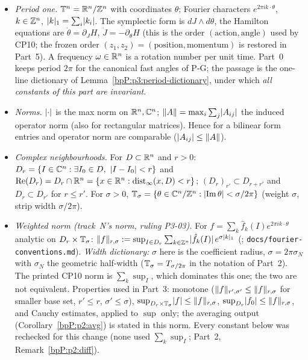 \begin{itemize}
\item \emph{Period one.} $\mathbb{T}^n=\mathbb{R}^n/\mathbb{Z}^n$ with coordinates $\theta$; Fourier characters $e^{2\pi ik\cdot\theta}$, $k\in\mathbb{Z}^n$,
  $\lvert k\rvert_1=\sum_i\lvert k_i\rvert$. The symplectic form is $dJ\wedge d\theta$, the Hamilton equations are $\dot\theta=\partial_JH$,
  $\dot J=-\partial_\theta H$ (this is the order $(\text{action},\text{angle})$ used by CP10; the frozen order
  $(z_1,z_2)=(\text{position},\text{momentum})$ is restored in Part~5). A frequency $\omega\in\mathbb{R}^n$ is a rotation number per unit time.
  Part~0 keeps period $2\pi$ for the canonical fast angles of P-G; the passage is the one-line dictionary of
  Lemma~\ref{bpP:p3:period-dictionary}, under which \emph{all constants of this part are invariant}.
\item \emph{Norms.} $\lvert \cdot\rvert$ is the max norm on $\mathbb{R}^n,\mathbb{C}^n$; $\lVert A\rVert=\max_i\sum_j\lvert A_{ij}\rvert$ the induced operator norm
  (also for rectangular matrices). Hence for a bilinear form entries and operator norm are comparable
  ($\lvert A_{ij}\rvert\le\lVert A\rVert$).
\item \emph{Complex neighbourhoods.} For $D\subset\mathbb{R}^n$ and $r>0$: $D_r=\{I\in\C^n:\exists I_0\in D,\ \abs{I-I_0}<r\}$
  and $\operatorname{Re}(D_r)=D_r\cap\mathbb{R}^n=\{x\in\mathbb{R}^n:\operatorname{dist}_\infty(x,D)<r\}$; $(D_r)_{r'}\subset D_{r+r'}$ and $D_{r}\subset D_{r'}$ for $r\le r'$.
  For $\sigma>0$, $\mathbb{T}_\sigma=\{\theta\in\mathbb{C}^n/\mathbb{Z}^n:\lvert \operatorname{Im}\theta\rvert<\sigma/2\pi\}$ (weight $\sigma$, strip width $\sigma/2\pi$).
\item \emph{Weighted norm (track~N's norm, ruling P3-03).} For $f=\sum_k\hat f_k(I)e^{2\pi ik\cdot\theta}$ analytic on $D_r\times\mathbb{T}_\sigma$:
  $\lVert f\rVert_{r,\sigma}:=\sup_{I\in D_r}\sum_{k\in\mathbb{Z}^n}\lvert \hat f_k(I)\rvert\,e^{\sigma\lvert k\rvert_1}$ (; \texttt{docs/fourier-conventions.md}). \emph{Width dictionary:} $\sigma$ here is the coefficient radius, $\sigma=2\pi\sigma_N$ with $\sigma_N$ the geometric half-width ($\mathbb{T}_\sigma=T_{\sigma/2\pi}$ in the notation of Part~2). The printed CP10 norm is $\sum_k\sup_I$, which dominates this one; the two are not equivalent.
  Properties used in Part~3: monotone ($\lVert f\rVert_{r',\sigma'}\le\lVert f\rVert_{r,\sigma}$ for smaller base set, $r'\le r$, $\sigma'\le\sigma$), $\sup_{D_r\times\mathbb{T}_\sigma}\lvert f\rvert\le\lVert f\rVert_{r,\sigma}$, $\sup_{D_r}\lvert f_0\rvert\le\lVert f\rVert_{r,\sigma}$, and Cauchy estimates, applied to $\sup$ only; the averaging output (Corollary~\ref{bpP:p2:avg}) is stated in this norm. Every constant below was rechecked for this change (none used $\sum_k\sup_I$; Part~2, Remark~\ref{bpP:p2:diff}).

\end{itemize}
